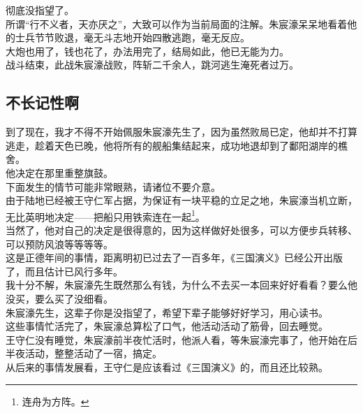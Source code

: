 \begin{multicols}{\theparacolNo}
彻底没指望了。\\

所谓“行不义者，天亦厌之”，大致可以作为当前局面的注解。朱宸濠呆呆地看着他的士兵节节败退，毫无斗志地开始四散逃跑，毫无反应。\\

大炮也用了，钱也花了，办法用完了，结局如此，他已无能为力。\\

战斗结束，此战朱宸濠战败，阵斩二千余人，跳河逃生淹死者过万。\\

\subsection{不长记性啊}
到了现在，我才不得不开始佩服朱宸濠先生了，因为虽然败局已定，他却并不打算逃走，趁着天色已晚，他将所有的舰船集结起来，成功地退却到了鄱阳湖岸的樵舍。\\

他决定在那里重整旗鼓。\\

下面发生的情节可能非常眼熟，请诸位不要介意。\\

由于陆地已经被王守仁军占据，为保证有一块平稳的立足之地，朱宸濠当机立断，无比英明地决定——把船只用铁索连在一起\footnote{连舟为方阵。}。\\

当然了，他对自己的决定是很得意的，因为这样做好处很多，可以方便步兵转移、可以预防风浪等等等等。\\

这是正德年间的事情，距离明初已过去了一百多年，《三国演义》已经公开出版了，而且估计已风行多年。\\

我十分不解，朱宸濠先生既然那么有钱，为什么不去买一本回来好好看看？要么他没买，要么买了没细看。\\

朱宸濠先生，这辈子你是没指望了，希望下辈子能够好好学习，用心读书。\\

这些事情忙活完了，朱宸濠总算松了口气，他活动活动了筋骨，回去睡觉。\\

王守仁没有睡觉，朱宸濠前半夜忙活时，他派人看，等朱宸濠完事了，他开始在后半夜活动，整整活动了一宿，搞定。\\

从后来的事情发展看，王守仁是应该看过《三国演义》的，而且还比较熟。\\


\end{multicols}
